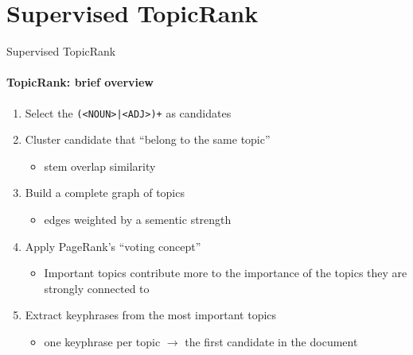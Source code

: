 \section{Supervised TopicRank}
  \begin{frame}{Supervised TopicRank}
    \framesubtitle{TopicRank: brief overview}

    \begin{enumerate}
      \item<+->{Select the \texttt{(<NOUN>|<ADJ>)+} as candidates}
      \item<+->{Cluster candidate that ``belong to the same topic''}
      \begin{itemize}
        \item{stem overlap similarity}
      \end{itemize}
      \item<+->{Build a complete graph of topics}
      \begin{itemize}
        \item{edges weighted by a sementic strength}
      \end{itemize}
      \item<+->{Apply PageRank's ``voting concept''}
      \begin{itemize}
        \item{Important topics contribute more to the importance of the topics
              they are strongly connected to}
      \end{itemize}
      \item<+->{Extract keyphrases from the most important topics}
      \begin{itemize}
        \item{one keyphrase per topic $\rightarrow$ the first candidate in the document}
      \end{itemize}
    \end{enumerate}
  \end{frame}

